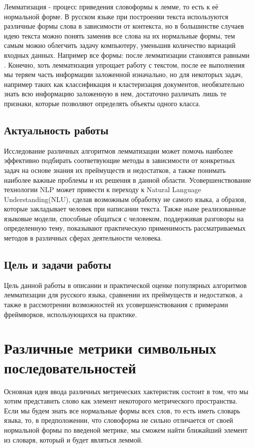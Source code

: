 \documentclass[12pt, a4paper]{article}
\begin{document}
Лемматизация - процесс приведения словоформы к лемме, то есть к её нормальной форме. В русском языке при построении текста используются различные формы слова в зависимости от контекста, но в большинстве случаев идею текста можно понять заменив все слова на их нормальные формы, тем самым можно облегчить задачу компьютеру, уменьшив количество вариаций входных данных. Например все формы:  после лемматизации становятся равными . Конечно, хоть лемматизация упрощает работу с текстом, после ее выполнения мы теряем часть информации заложенной изначально, но для некоторых задач, например таких как классификация и кластеризация документов, необязательно знать всю информацию заложенную в нем, достаточно различать лишь те признаки, которые позволяют определять объекты одного класса.

\subsection{Актуальность работы}
\quad Исследование различных алгоритмов лемматизации может помочь наиболее эффективно подбирать соответвующие методы в зависимости от конкретных задач на основе знания их преймуществ и недостатков, а также понимать наиболее важные проблемы и их решения в данной области. Усовершенствование технологии NLP может привести к переходу к Natural Language Understanding(NLU), сделав возможным обработку не самого языка, а образов, которые закладывает человек при написании текста. Также ныне реализованные языковые модели, способные общаться с человеком, поддерживая разговоры на определенную тему, показывают практическую применимость рассматриваемых методов в различных сферах деятельности человека.

\subsection{Цель и задачи работы}
\quad Цель данной работы в описании и практической оценке популярных алгоритмов лемматизации для русского языка, сравнении их преймуществ и недостатков, а также в рассмотрении возможностей их усовершенствования с примерами фреймворков, использующихся на практике.

\section{Различные метрики символьных последовательностей}
\quad Основная идея ввода различных метрических хактеристик состоит в том, что мы хотим представить слово как элемент некоторого метрического пространства. Если мы будем знать все нормальные формы всех слов, то есть иметь словарь языка, то, в предположении, что словоформа не сильно отличается от своей нормальной формы по введеной метрике, мы сможем найти ближайший элемент из словаря, который и будет являться леммой.
\end{document}
